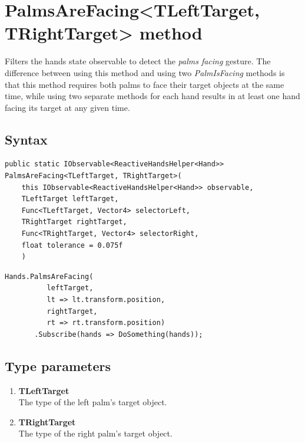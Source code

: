 \documentclass[12pt,a4paper,twoside]{report}
\begin{document}
\section{PalmsAreFacing<TLeftTarget, TRightTarget> method}
Filters the hands state observable to detect the \textit{palms facing} gesture. The difference between using this method and using two \textit{PalmIsFacing} methods is that this method requires both palms to face their target objects at the same time, while using two separate methods for each hand results in at least one hand facing its target at any given time.

\subsection{Syntax}
\begin{lstlisting}[caption=Declaration]
  public static IObservable<ReactiveHandsHelper<Hand>> PalmsAreFacing<TLeftTarget, TRightTarget>(
    this IObservable<ReactiveHandsHelper<Hand>> observable,
    TLeftTarget leftTarget,
    Func<TLeftTarget, Vector4> selectorLeft,
    TRightTarget rightTarget,
    Func<TRightTarget, Vector4> selectorRight,
    float tolerance = 0.075f
    )
\end{lstlisting}

\begin{lstlisting}[caption=Usage example]
  Hands.PalmsAreFacing(
          leftTarget,
          lt => lt.transform.position,
          rightTarget,
          rt => rt.transform.position)
       .Subscribe(hands => DoSomething(hands));
\end{lstlisting}

\subsection{Type parameters}
\begin{enumerate}
  \item \textbf{TLeftTarget}\\
    The type of the left palm's target object.
  \item \textbf{TRightTarget}\\
    The type of the right palm's target object.
\end{enumerate}
\end{document}
